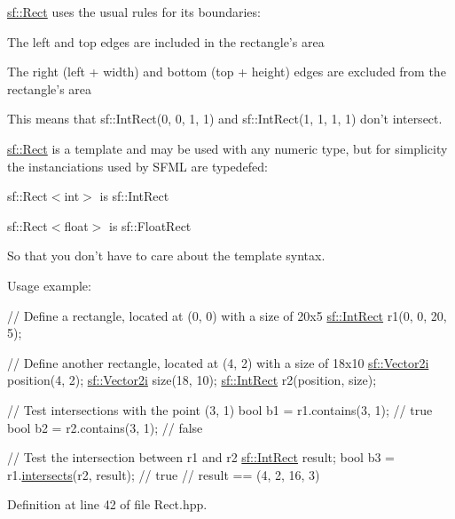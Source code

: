 \hyperlink{classsf_1_1Rect}{sf\-::\-Rect} uses the usual rules for its boundaries\-: \begin{DoxyItemize}
\item The left and top edges are included in the rectangle's area \item The right (left + width) and bottom (top + height) edges are excluded from the rectangle's area\end{DoxyItemize}
This means that sf\-::\-Int\-Rect(0, 0, 1, 1) and sf\-::\-Int\-Rect(1, 1, 1, 1) don't intersect.

\hyperlink{classsf_1_1Rect}{sf\-::\-Rect} is a template and may be used with any numeric type, but for simplicity the instanciations used by S\-F\-M\-L are typedefed\-: \begin{DoxyItemize}
\item sf\-::\-Rect$<$int$>$ is sf\-::\-Int\-Rect \item sf\-::\-Rect$<$float$>$ is sf\-::\-Float\-Rect\end{DoxyItemize}
So that you don't have to care about the template syntax.

Usage example\-: 
\begin{DoxyCode}
\textcolor{comment}{// Define a rectangle, located at (0, 0) with a size of 20x5}
\hyperlink{classsf_1_1Rect}{sf::IntRect} r1(0, 0, 20, 5);

\textcolor{comment}{// Define another rectangle, located at (4, 2) with a size of 18x10}
\hyperlink{classsf_1_1Vector2}{sf::Vector2i} position(4, 2);
\hyperlink{classsf_1_1Vector2}{sf::Vector2i} size(18, 10);
\hyperlink{classsf_1_1Rect}{sf::IntRect} r2(position, size);

\textcolor{comment}{// Test intersections with the point (3, 1)}
\textcolor{keywordtype}{bool} b1 = r1.contains(3, 1); \textcolor{comment}{// true}
\textcolor{keywordtype}{bool} b2 = r2.contains(3, 1); \textcolor{comment}{// false}

\textcolor{comment}{// Test the intersection between r1 and r2}
\hyperlink{classsf_1_1Rect}{sf::IntRect} result;
\textcolor{keywordtype}{bool} b3 = r1.\hyperlink{classsf_1_1Rect_a566740c8f58e01bb052266f47e7e1011}{intersects}(r2, result); \textcolor{comment}{// true}
\textcolor{comment}{// result == (4, 2, 16, 3)}
\end{DoxyCode}
 

Definition at line 42 of file Rect.\-hpp.



